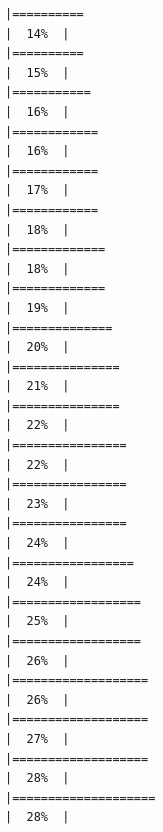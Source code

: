 \documentclass[
]{book}
\begin{document}
\begin{verbatim}
|==========                                                            |  14%  |                                                                              |==========                                                            |  15%  |                                                                              |===========                                                           |  16%  |                                                                              |============                                                          |  16%  |                                                                              |============                                                          |  17%  |                                                                              |============                                                          |  18%  |                                                                              |=============                                                         |  18%  |                                                                              |=============                                                         |  19%  |                                                                              |==============                                                        |  20%  |                                                                              |===============                                                       |  21%  |                                                                              |===============                                                       |  22%  |                                                                              |================                                                      |  22%  |                                                                              |================                                                      |  23%  |                                                                              |================                                                      |  24%  |                                                                              |=================                                                     |  24%  |                                                                              |==================                                                    |  25%  |                                                                              |==================                                                    |  26%  |                                                                              |===================                                                   |  26%  |                                                                              |===================                                                   |  27%  |                                                                              |===================                                                   |  28%  |                                                                              |====================                                                  |  28%  |                                                                              
\end{verbatim}
\end{document}

